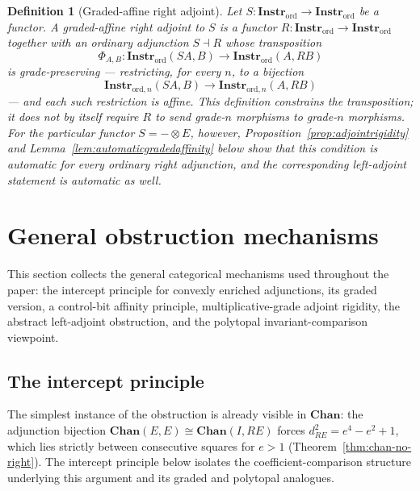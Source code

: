 \documentclass[11pt]{article}
\newtheorem{definition}[theorem]{Definition}
\begin{document}
\begin{definition}[Graded-affine right adjoint]
\label{def:graded-affine-right-adjoint}
Let $S:\mathbf{Instr}_{\mathrm{ord}}\to\mathbf{Instr}_{\mathrm{ord}}$ be a
functor. A \emph{graded-affine right adjoint} to $S$ is a functor
$R:\mathbf{Instr}_{\mathrm{ord}}\to\mathbf{Instr}_{\mathrm{ord}}$ together
with an ordinary adjunction $S\dashv R$ whose transposition
\[
\Phi_{A,B}:
\mathbf{Instr}_{\mathrm{ord}}(SA,B)
\longrightarrow
\mathbf{Instr}_{\mathrm{ord}}(A,RB)
\]
is grade-preserving --- restricting, for every $n$, to a bijection
\[
\mathbf{Instr}_{\mathrm{ord},n}(SA,B)
\longrightarrow
\mathbf{Instr}_{\mathrm{ord},n}(A,RB)
\]
--- and each such restriction is affine. This definition constrains the
transposition; it does not by itself require $R$ to send grade-$n$ morphisms
to grade-$n$ morphisms. For the particular functor $S=-\otimes E$, however,
Proposition~\ref{prop:adjointrigidity} and
Lemma~\ref{lem:automaticgradedaffinity} below show that this condition is
automatic for every ordinary right adjunction, and the corresponding
left-adjoint statement is automatic as well.
\end{definition}

\section{General obstruction mechanisms}
\label{sec:general}

This section collects the general categorical mechanisms used throughout the
paper: the intercept principle for convexly enriched adjunctions, its graded
version, a control-bit affinity principle, multiplicative-grade adjoint
rigidity, the abstract left-adjoint obstruction, and the polytopal
invariant-comparison viewpoint.

\subsection{The intercept principle}

The simplest instance of the obstruction is already visible in
$\mathbf{Chan}$: the adjunction bijection
$\mathbf{Chan}(E,E)\cong\mathbf{Chan}(I,RE)$ forces $d_{RE}^2=e^4-e^2+1$,
which lies strictly between consecutive squares for $e>1$
(Theorem~\ref{thm:chan-no-right}). The intercept principle below isolates
the coefficient-comparison structure underlying this argument and its
graded and polytopal analogues.
\end{document}
